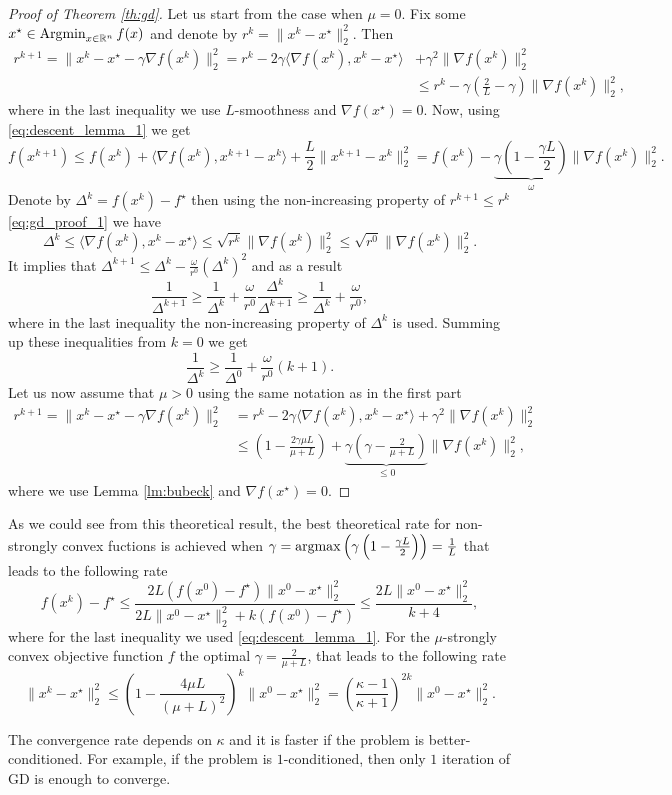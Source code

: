 \begin{proof}[Proof of Theorem \ref{th:gd}]
Let us start from the case when $\mu = 0$. Fix some $x^\star\in\operatorname*{Argmin}_{x\in\mathbb{R}^n} f(x)$ and denote by $r^k = \|x^k-x^\star\|^2_2$.
Then 
\begin{align}\label{eq:gd_proof_1}
r^{k+1} = \|x^k - x^\star - \gamma\nabla f(x^k)\|_2^2 = r^k - 2\gamma\langle \nabla f(x^k), x^k - x^\star\rangle &+ \gamma^2\|\nabla f(x^k)\|_2^2\nonumber\\
&\leq r^k - \gamma\left(\frac2L - \gamma\right)\|\nabla f(x^k)\|_2^2,
\end{align}
where in the last inequality we use $L$-smoothness and $\nabla f(x^\star) = 0$. Now, using \eqref{eq:descent_lemma_1} we get
$$
f(x^{k+1})\leq f(x^k) + \langle \nabla f(x^k), x^{k+1} - x^k\rangle + \frac{L}{2}\|x^{k+1}- x^k\|_2^2 = f(x^k) - \underbrace{\gamma\left(1 - \frac{\gamma L}{2}\right)}_{\omega}\|\nabla f(x^k)\|_2^2.
$$
Denote by $\Delta^k = f(x^k)-f^\star$ then using the non-increasing property of $r^{k+1}\leq r^k$ \eqref{eq:gd_proof_1} we have
$$
\Delta^k \leq\langle\nabla f(x^k), x^k-x^\star\rangle\leq \sqrt{r^k}\|\nabla f(x^k)\|_2^2\leq \sqrt{r^0}\|\nabla f(x^k)\|_2^2.
$$
It implies that $\Delta^{k+1}\leq\Delta^k - \frac{\omega}{r^0}(\Delta^k)^2$ and as a result
$$
\frac{1}{\Delta^{k+1}}\geq \frac{1}{\Delta^k} + \frac{\omega}{r^0}\frac{\Delta^k}{\Delta^{k+1}}\geq \frac{1}{\Delta^k} + \frac{\omega}{r^0},
$$
where in the last inequality the non-increasing property of $\Delta^k$ is used.
Summing up these inequalities from $k=0$ we get
$$
\frac{1}{\Delta^k}\geq \frac{1}{\Delta^0} + \frac{\omega}{r^0}(k+1).
$$
Let us now assume that $\mu> 0$ using the same notation as in the first part
\begin{align}
r^{k+1} = \|x^k - x^\star - \gamma \nabla f(x^k)\|_2^2 &= r^k - 2\gamma\langle \nabla f(x^k), x^k - x^\star\rangle + \gamma^2\|\nabla f(x^k)\|_2^2\nonumber\\
&\leq \left(1-\frac{2\gamma\mu L}{\mu + L}\right) + \underbrace{\gamma\left(\gamma - \frac{2}{\mu + L}\right)}_{\leq 0}\|\nabla f(x^k)\|_2^2,
\end{align}
where we use Lemma \ref{lm:bubeck} and $\nabla f(x^\star) = 0$.
\end{proof}
As we could see from this theoretical result, the best theoretical rate for non-strongly convex fuctions is achieved when $\gamma = \operatorname*{argmax}\left(\gamma\left(1 - \frac{\gamma L}{2}\right)\right) = \frac{1}{L}$ that leads to the following rate
\begin{equation}\label{eq:gd_rate}
    f(x^k) - f^\star \leq \frac{2L(f(x^0)-f^\star)\|x^0-x^\star\|_2^2}{2L\|x^0-x^\star\|_2^2 +k(f(x^0) - f^\star)}\leq \frac{2L\|x^0-x^\star\|^2_2}{k+4},
\end{equation}
where for the last inequality we used \eqref{eq:descent_lemma_1}.
For the $\mu$-strongly convex objective function $f$ the optimal $\gamma= \frac{2}{\mu + L}$, that leads to the following rate
\begin{equation}\label{eq:gd_rate_strongly}
\|x^k-x^\star\|_2^2\leq\left(1-\frac{4\mu L}{(\mu + L)^2}\right)^k\|x^0-x^\star\|_2^2 = \left(\frac{\kappa - 1}{\kappa + 1}\right)^{2k}\|x^0-x^\star\|_2^2.
\end{equation}

{\color{blue} The convergence rate depends on $\kappa$ and it is faster if the problem is better-conditioned. For example, if the problem is $1$-conditioned, then only $1$ iteration of GD is enough to converge.}